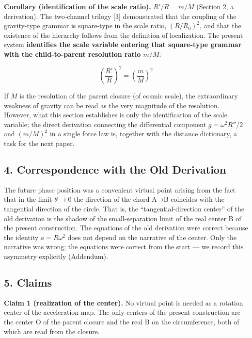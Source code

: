 \documentclass[
  a4paper,
]{article}
\begin{document}
\textbf{Corollary (identification of the scale ratio).} \(R'/R=m/M\)
(Section 2, a derivation). The two-channel trilogy {[}3{]} demonstrated
that the coupling of the gravity-type grammar is square-type in the
scale ratio, \((R/R_0)^2\), and that the existence of the hierarchy
follows from the definition of localization. The present system
\textbf{identifies the scale variable entering that square-type grammar
with the child-to-parent resolution ratio \(m/M\)}:

\[
\left(\frac{R'}{R}\right)^2=\left(\frac{m}{M}\right)^2
\]

If \(M\) is the resolution of the parent closure (of cosmic scale), the
extraordinary weakness of gravity can be read as the very magnitude of
the resolution. However, what this section establishes is only the
identification of the scale variable; the direct derivation connecting
the differential component \(g=\omega^2R''/2\) and \((m/M)^2\) in a
single force law is, together with the distance dictionary, a task for
the next paper.

\subsection{4. Correspondence with the Old
Derivation}\label{correspondence-with-the-old-derivation}

The future phase position was a convenient virtual point arising from
the fact that in the limit \(\theta\to0\) the direction of the chord A→B
coincides with the tangential direction of the circle. That is, the
``tangential-direction center'' of the old derivation is the shadow of
the small-separation limit of the real center B of the present
construction. The equations of the old derivation were correct because
the identity \(a=R\omega^2\) does not depend on the narrative of the
center. Only the narrative was wrong; the equations were correct from
the start --- we record this asymmetry explicitly (Addendum).

\subsection{5. Claims}\label{claims}

\textbf{Claim 1 (realization of the center).} No virtual point is needed
as a rotation center of the acceleration map. The only centers of the
present construction are the center O of the parent closure and the real
B on the circumference, both of which are read from the closure.
\end{document}
